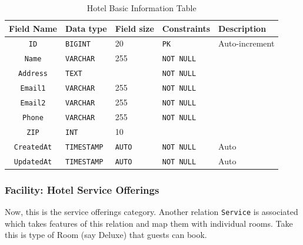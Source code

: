 \begin{table}[H]
	\centering
	\begin{tabular}{cllll}
		\hline
		Field Name & Data type & Field size & Constraints & Description \\ \hline
		\texttt{ID} & \texttt{BIGINT} & 20 & \texttt{PK} & Auto-increment \\
		\texttt{Name} & \texttt{VARCHAR} & 255 & \texttt{NOT NULL} &  \\
		\texttt{Address} & \texttt{TEXT} & & \texttt{NOT NULL} &  \\
		\texttt{Email1} & \texttt{VARCHAR} & 255 & \texttt{NOT NULL} &  \\
		\texttt{Email2} & \texttt{VARCHAR} & 255 & \texttt{NOT NULL} &  \\
		\texttt{Phone} & \texttt{VARCHAR} & 255 & \texttt{NOT NULL} &  \\
		\texttt{ZIP} & \texttt{INT} & 10 & &  \\
		
		\texttt{CreatedAt} & \texttt{TIMESTAMP} & \texttt{AUTO} & \texttt{NOT NULL} & Auto \\
		\texttt{UpdatedAt} & \texttt{TIMESTAMP} & \texttt{AUTO} & \texttt{NOT NULL} & Auto \\
		\hline
	\end{tabular}
	\caption{Hotel Basic Information Table}
\end{table}

\subsubsection{Facility: Hotel Service Offerings}

Now, this is the service offerings category. Another relation \texttt{Service} is associated which takes features of this relation and map them with individual rooms. Take this is type of Room (say Deluxe) that guests can book.

